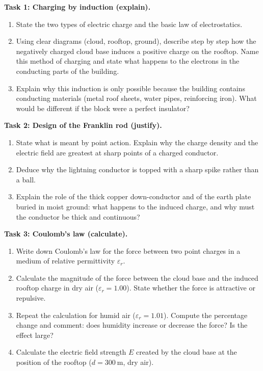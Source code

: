 \documentclass[11pt]{article}
\newcommand{\cle}[1]{{\popxbold\color{popdark}#1}}
\begin{document}
\textbf{Task 1: Charging by induction (explain).}
\begin{enumerate}
\item State the two types of electric charge and the basic law of electrostatics.
\item Using clear diagrams (cloud, rooftop, ground), describe step by step how the negatively charged cloud base induces a positive charge on the rooftop. Name this method of charging and state what happens to the electrons in the conducting parts of the building.
\item Explain why this induction is only possible because the building contains conducting materials (metal roof sheets, water pipes, reinforcing iron). What would be different if the block were a perfect insulator?
\end{enumerate}

\textbf{Task 2: Design of the Franklin rod (justify).}
\begin{enumerate}
\item State what is meant by \cle{point action}. Explain why the charge density and the electric field are greatest at sharp points of a charged conductor.
\item Deduce why the lightning conductor is topped with a sharp spike rather than a ball.
\item Explain the role of the thick copper down-conductor and of the earth plate buried in moist ground: what happens to the induced charge, and why must the conductor be thick and continuous?
\end{enumerate}

\textbf{Task 3: Coulomb's law (calculate).}
\begin{enumerate}
\item Write down Coulomb's law for the force between two point charges in a medium of relative permittivity $\varepsilon_r$.
\item Calculate the magnitude of the force between the cloud base and the induced rooftop charge in dry air ($\varepsilon_r = 1.00$). State whether the force is attractive or repulsive.
\item Repeat the calculation for humid air ($\varepsilon_r = 1.01$). Compute the percentage change and comment: does humidity increase or decrease the force? Is the effect large?
\item Calculate the electric field strength $E$ created by the cloud base at the position of the rooftop ($d = 300\ \mathrm{m}$, dry air).
\end{enumerate}
\end{document}
